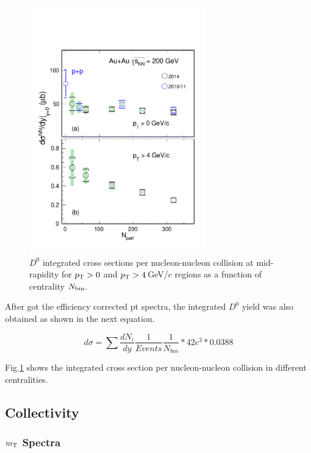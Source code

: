 \begin{figure}
\centering
\includegraphics[width=0.68\textwidth]{figure/Run14_D0HFT/Xsection_D0.pdf}
\caption{$D^{0}$ integrated cross sections per nucleon-nucleon collision at mid-rapidity for $p_{\rm T}>0$ and $p_{\rm T}>4$\,GeV/$c$ regions as a function of centrality $N_{\rm bin}$.}
\label{Xsection_D0} 
\end{figure}

After got the efficiency corrected pt spectra, the integrated $D^0$ yield was also obtained as shown in the next equation.

\begin{equation}
  d\sigma = \sum \frac{dN_{i}}{dy}\frac{1}{Events}\frac{1}{N_{bin}} * 42e^3 * 0.0388
\end{equation}

Fig.\ref{Xsection_D0} shows the integrated cross section per nucleon-nucleon collision in different centralities.

\subsection{\label{result:collectivity}Collectivity}

\subsubsection{\label{result:collectivity:mT}$m_{\rm T}$ Spectra}


